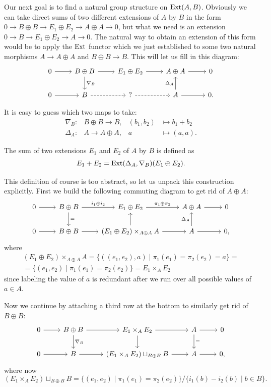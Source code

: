 Our next goal is to find a natural group structure on $\operatorname{Ext}(A,B)$. Obviously we can take direct sums of two different extensions of $A$ by $B$ in the form $0\to B\oplus B\to E_1\oplus E_2\to A\oplus A\to 0$, but what we need is an extension $0\to B\to E_1\oplus E_2\to A\to 0$. The natural way to obtain an extension of this form would be to apply the $\operatorname{Ext}$ functor which we just established to some two natural morphisms $A\to A\oplus A$ and $B\oplus B\to B$. This will let us fill in this diagram:
    \[\begin{tikzcd}
        0\arrow[r] & B\oplus B\arrow[r]\arrow[d,"\nabla_B"] & E_1\oplus E_2 \arrow[r] & A\oplus A\arrow[r] & 0 \\
        0\arrow[r] & B\arrow[r,dashed]       & ?  \arrow[r,dashed]    & A\arrow[r] \arrow[u,"\Delta_A"] & 0.
    \end{tikzcd}\]

It is easy to guess which two maps to take:
\begin{align}
    \nabla_B:&B\oplus B\to B,  &(b_1,b_2)&\mapsto b_1+b_2\\
    \Delta_A:&A\to A\oplus A,  &a&\mapsto (a,a).
\end{align}

\begin{defn}
    The sum of two extensions $E_1$ and $E_2$ of $A$ by $B$ is defined as
    \[E_1+E_2=\operatorname{Ext}(\Delta_A,\nabla_B)(E_1\oplus E_2).\]
\end{defn}

This definition of course is too abstract, so let us unpack this construction explicitly.
First we build the following commuting diagram to get rid of $A\oplus A$:
\[\begin{tikzcd}
    0\arrow[r] & B\oplus B\arrow[r,"i_1\oplus i_2"]\arrow[d,"="] & E_1\oplus E_2 \arrow[r,"\pi_1\oplus \pi_2"] & A\oplus A\arrow[r] & 0 \\
    0\arrow[r] & B\oplus B\arrow[r]       & (E_1\oplus E_2)\times_{A\oplus A}A  \arrow[r] \arrow[u]   & A\arrow[r] \arrow[u,"\Delta_A"] & 0,
\end{tikzcd}\]
where
\begin{multline}
    (E_1\oplus E_2)\times_{A\oplus A}A=\{((e_1,e_2),a)\mid \pi_1(e_1)=\pi_2(e_2)=a\} =\\
    =\{(e_1,e_2)\mid\pi_1(e_1)=\pi_2(e_2)\}=E_1\times_A E_2
\end{multline}
since labeling the value of $a$ is redundant after we run over all possible values of $a\in A$.

Now we continue by attaching a third row at the bottom to similarly get rid of $B\oplus B$:
\[\begin{tikzcd}
    0\arrow[r] & B\oplus B\arrow[r] \arrow[d,"\nabla_B"]   & E_1\times_A E_2\arrow[d]  \arrow[r]  & A\arrow[r]\arrow[d,"="] & 0\\
    0\arrow[r] & B \arrow[r] & (E_1\times_A E_2)\sqcup_{B\oplus B}B\arrow[r] & A\arrow[r]&0,
\end{tikzcd}\]
where now 
\[(E_1\times_A E_2)\sqcup_{B\oplus B}B=\{(e_1,e_2)\mid \pi_1(e_1)=\pi_2(e_2)\}\slash\{i_1(b)-i_2(b)\mid b\in B\}.\]


